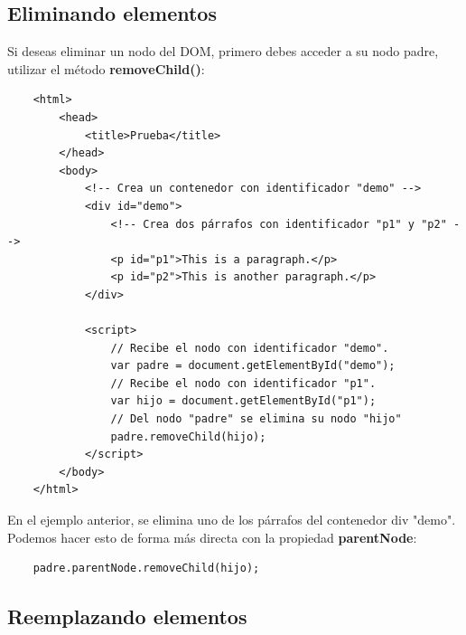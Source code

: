 \subsection{Eliminando elementos}

Si deseas eliminar un nodo del DOM, primero debes acceder a su nodo padre, utilizar el método \textbf{removeChild()}:
\begin{lstlisting}
    <html>
        <head>
            <title>Prueba</title>
        </head>
        <body>
            <!-- Crea un contenedor con identificador "demo" -->
            <div id="demo">
                <!-- Crea dos párrafos con identificador "p1" y "p2" -->
                <p id="p1">This is a paragraph.</p>
                <p id="p2">This is another paragraph.</p>
            </div>
            
            <script>
                // Recibe el nodo con identificador "demo".
                var padre = document.getElementById("demo");
                // Recibe el nodo con identificador "p1".
                var hijo = document.getElementById("p1");
                // Del nodo "padre" se elimina su nodo "hijo"
                padre.removeChild(hijo);
            </script>
        </body>
    </html>
\end{lstlisting}

En el ejemplo anterior, se elimina uno de los párrafos del contenedor div "demo". Podemos hacer esto de forma más directa con la propiedad \textbf{parentNode}:
\begin{lstlisting}
    padre.parentNode.removeChild(hijo);
\end{lstlisting}


\subsection{Reemplazando elementos}


